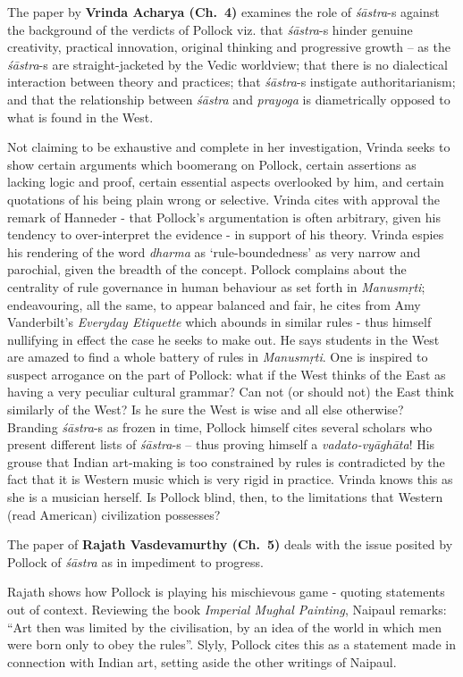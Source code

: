 The paper by {\bf Vrinda Acharya (Ch.~4)} examines the role of {\sl śāstra}-s against the background of the verdicts of Pollock viz. that {\sl śāstra}-s hinder genuine creativity, practical innovation, original thinking and progressive growth -- as the {\sl śāstra}-s are straight-jacketed by the Vedic worldview; that there is no dialectical interaction between theory and practices; that {\sl śāstra}-s instigate authoritarianism; and that the relationship between {\sl śāstra} and {\sl prayoga} is diametrically opposed to what is found in the West.

Not claiming to be exhaustive and complete in her investigation, Vrinda seeks to show certain arguments which boomerang on Pollock, certain assertions as lacking logic and proof, certain essential aspects overlooked by him, and certain quotations of his being plain wrong or selective. Vrinda cites with approval the remark of Hanneder - that Pollock’s argumentation is often arbitrary, given his tendency to over-interpret the evidence - in support of his theory. Vrinda espies his rendering of the word {\sl dharma} as ‘rule-boundedness’ as very narrow and parochial, given the breadth of the concept. Pollock complains about the centrality of rule governance in human behaviour as set forth in {\sl Manusmṛti}; endeavouring, all the same, to appear balanced and fair, he cites from Amy Vanderbilt’s {\sl Everyday Etiquette} which abounds in similar rules - thus himself nullifying in effect the case he seeks to make out. He says students in the West are amazed to find a whole battery of rules in {\sl Manusmṛti}. One is inspired to suspect arrogance on the part of Pollock: what if the West thinks of the East as having a very peculiar cultural grammar? Can not (or should not) the East think similarly of the West? Is he sure the West is wise and all else otherwise? Branding {\sl śāstra}-s as frozen in time, Pollock himself cites several scholars who present different lists of {\sl śāstra}-s -- thus proving himself a {\sl vadato-vyāghāta}! His grouse that Indian art-making is too constrained by rules is contradicted by the fact that it is Western music which is very rigid in practice. Vrinda knows this as she is a musician herself. Is Pollock blind, then, to the limitations that Western (read American) civilization possesses?

The paper of {\bf Rajath Vasdevamurthy (Ch.~5)} deals with the issue posited by Pollock  of {\sl śāstra} as in impediment to progress.

Rajath shows how Pollock is playing his mischievous game - quoting statements out of context. Reviewing the book {\sl Imperial Mughal Painting}, Naipaul remarks: “Art then was limited by the civilisation, by an idea of the world in which men were born only to obey the rules”. Slyly, Pollock cites this as a statement made in connection with Indian art, setting aside the other writings of Naipaul.

